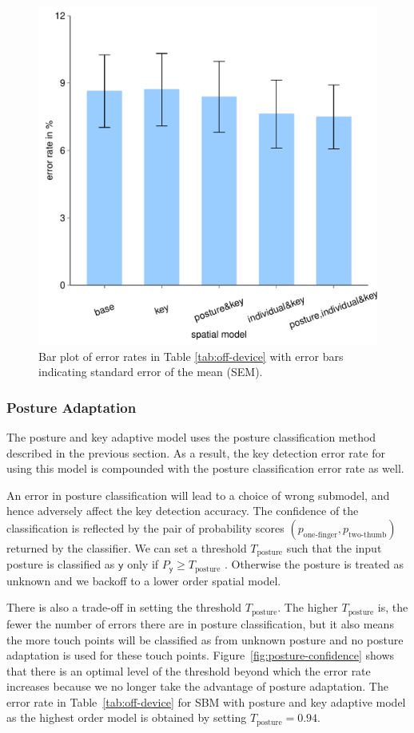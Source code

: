 \documentclass{sigchi}
\begin{document}
\begin{figure}[tb]
  \centering
  \includegraphics[width=0.8\columnwidth,
    height=0.6\columnwidth]{figures/error-rates2.pdf} 
  \caption{Bar plot of error rates in Table \ref{tab:off-device} with error
  bars indicating standard error of the mean (SEM).}
  \label{fig:error-bar2}
\end{figure}

\subsubsection{Posture Adaptation}\label{sec:off-device-posture}
The posture and key adaptive model uses the posture classification
method described in the previous section. As a result, the
key detection error rate for using this model is compounded with the posture
classification error rate as well. 

An error in posture classification will lead to a choice of wrong submodel,
and hence adversely affect the key detection accuracy. The confidence of the classification is reflected by the pair of probability 
scores $(p_{\text{one-finger}}, p_{\text{two-thumb}})$ returned by the classifier. 
We can set a threshold $T_{\text{posture}}$ such that the input posture is classified
as $\textsf{y}$ only if $P_\textsf{y} \ge T_{\text{posture}}$ . Otherwise the posture is treated as
unknown and we backoff to a lower order spatial model.

There is also a trade-off in setting the threshold $T_{\text{posture}}$. The higher
 $T_{\text{posture}}$ is, the fewer the number of errors there are in posture classification, but it also means the more touch points will be classified as from unknown posture and no posture adaptation is used for these touch points. Figure~\ref{fig:posture-confidence} 
 shows that there is an optimal level of the threshold beyond which the error rate
 increases because we no longer take the advantage of posture adaptation. The error rate in Table~\ref{tab:off-device} for SBM with posture and key adaptive model as the highest order model is obtained by setting $T_{\text{posture}} = 0.94$.
\end{document}
